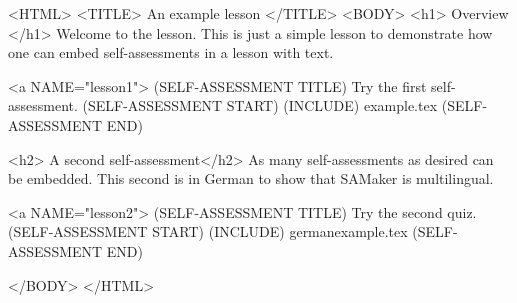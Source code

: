 <HTML>
<TITLE>
An example lesson
</TITLE>
<BODY>
<h1> Overview </h1>
Welcome to the lesson.  This is just a simple lesson to demonstrate
how one can embed self-assessments in a lesson with text.

<a NAME="lesson1">
(SELF-ASSESSMENT TITLE) Try the first self-assessment.
(SELF-ASSESSMENT START)
(INCLUDE) example.tex
(SELF-ASSESSMENT END)

<h2> A second self-assessment</h2>
As many self-assessments as desired can be embedded.
This second is in German to show that SAMaker is multilingual.

<a NAME="lesson2">
(SELF-ASSESSMENT TITLE) Try the second quiz.
(SELF-ASSESSMENT START)
(INCLUDE) germanexample.tex
(SELF-ASSESSMENT END)

</BODY>
</HTML>
